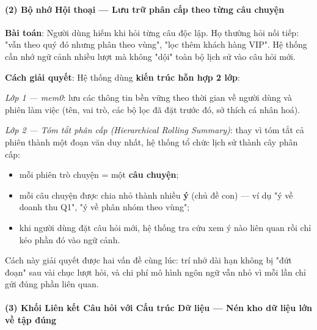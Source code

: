 \documentclass[11pt,a4paper]{article}
\begin{document}
\paragraph{(2) Bộ nhớ Hội thoại --- Lưu trữ phân cấp theo từng câu chuyện}

\begin{tcolorbox}[notebox]
\textbf{Bài toán}: Người dùng hiếm khi hỏi từng câu độc lập. Họ thường hỏi nối tiếp: "vẫn theo quý đó nhưng phân theo vùng", "lọc thêm khách hàng VIP". Hệ thống cần nhớ ngữ cảnh nhiều lượt mà không "dội" toàn bộ lịch sử vào câu hỏi mới.

\textbf{Cách giải quyết}: Hệ thống dùng \textbf{kiến trúc hỗn hợp 2 lớp}:

\textit{Lớp 1 --- mem0}: lưu các thông tin bền vững theo thời gian về người dùng và phiên làm việc (tên, vai trò, các bộ lọc đã đặt trước đó, sở thích cá nhân hoá).

\textit{Lớp 2 --- Tóm tắt phân cấp (Hierarchical Rolling Summary)}: thay vì tóm tắt cả phiên thành một đoạn văn duy nhất, hệ thống tổ chức lịch sử thành cây phân cấp:
\begin{itemize}
\item mỗi phiên trò chuyện = một \textbf{câu chuyện};
\item mỗi câu chuyện được chia nhỏ thành nhiều \textbf{ý} (chủ đề con) --- ví dụ "ý về doanh thu Q1", "ý về phân nhóm theo vùng";
\item khi người dùng đặt câu hỏi mới, hệ thống tra cứu xem ý nào liên quan rồi chỉ kéo phần đó vào ngữ cảnh.
\end{itemize}

Cách này giải quyết được hai vấn đề cùng lúc: trí nhớ dài hạn không bị "đứt đoạn" sau vài chục lượt hỏi, và chi phí mô hình ngôn ngữ vẫn nhỏ vì mỗi lần chỉ gửi đúng phần liên quan.
\end{tcolorbox}

\paragraph{(3) Khối Liên kết Câu hỏi với Cấu trúc Dữ liệu --- Nén kho dữ liệu lớn về tập đúng}
\end{document}
